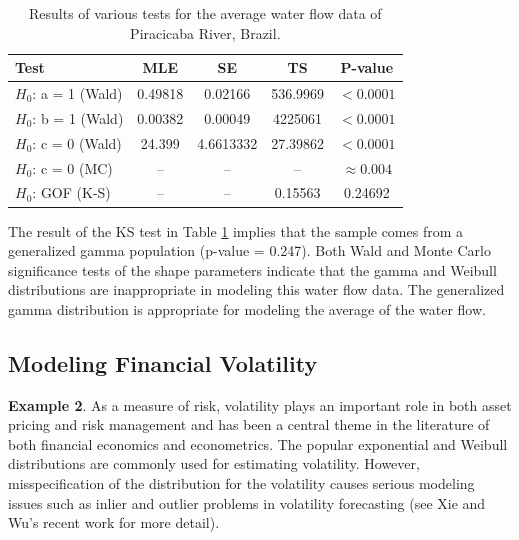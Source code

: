 \documentclass{ps}
\theoremstyle{plain}%
\theoremstyle{definition}
\theoremstyle{remark}
\begin{document}
\begin{center}
\begin{table}[h!]
	\caption{Results of various tests for the average water flow data of Piracicaba River, Brazil. }
	{\begin{tabular}{lcccc} \hline
			Test                & MLE      &   SE      &  TS        & P-value         \\ \hline
			$H_0$: a = 1 (Wald) & 0.49818  & 0.02166   & 536.9969   & $< 0.0001$      \\
			$H_0$: b = 1 (Wald) & 0.00382  & 0.00049   &  4225061   & $< 0.0001$      \\
			$H_0$: c = 0 (Wald) & 24.399   & 4.6613332 & 27.39862   & $< 0.0001$      \\ 
			$H_0$: c = 0 (MC)   &   --     &   --      &    --      & $\approx 0.004$ \\ 
			$H_0$:  GOF (K-S)   &   --     &   --      & 0.15563    & 0.24692         \\
			\hline
	\end{tabular}}
	\label{Environmental-data}	
\end{table}
\end{center}

The result of the KS test in Table \ref{Environmental-data} implies that the sample comes from a generalized gamma population (p-value = 0.247). Both Wald and Monte Carlo significance tests of the shape parameters indicate that the gamma and Weibull distributions are inappropriate in modeling this water flow data. The generalized gamma distribution is appropriate for modeling the average of the water flow.

\subsection{Modeling Financial Volatility }

{\bf Example 2}.  As a measure of risk, volatility plays an important role in both asset pricing and risk management and has been a central theme in the literature of both financial economics and econometrics. The popular exponential and Weibull distributions are commonly used for estimating volatility. However, misspecification of the distribution for the volatility causes serious modeling issues such as inlier and outlier problems in volatility forecasting (see Xie and Wu's \cite{Xie-Wu-2017} recent work for more detail). 
\end{document}
